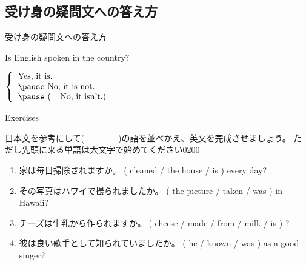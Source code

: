 \documentclass[aspectratio=169,xcolor={dvipsnames,table}]{beamer}
\newcommand{\myaudio}[1]{\href{#1}{\faVolumeUp}}
\begin{document}
\subsection{受け身の疑問文への答え方}
\begin{frame}[plain]{受け身の疑問文への答え方}
 \Large

Is English spoken in the country?

\vspace{20pt}
\pause

\mbox{}\hspace{100pt}$\left\{\begin{tabular}{ll}
         \text{Yes, it is.}&\\\pause
         \text{No, it is not.}&\\\pause
         \text{(}= \text{No, it isn't.)}&
        \end{tabular}\right.$



\end{frame}
\begin{frame}[plain]{Exercises}
 
{\small 日本文を参考にして(~~~~~~~~)の語を並べかえ、英文を完成させましょう。
ただし先頭に来る単語は大文字で始めてください}\hfill{\tiny 0200}\,{\scriptsize \myaudio{./audio/051_passive_08.mp3}}

\begin{enumerate}
 \item {\small 家は毎日掃除されますか。}
( cleaned / the house / is ) every day?\\
 \item {\small その写真はハワイで撮られましたか。}
( the picture / taken /  was ) in Hawaii?\\
 \item {\small チーズは牛乳から作られますか}。
( cheese / made / from / milk / is ) ?\\
 \item {\small 彼は良い歌手として知られていましたか。}
( he / known /  was ) as a good singer?\\
\end{enumerate}

\end{frame}
\end{document}
